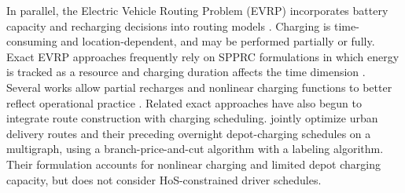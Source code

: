 \documentclass[3p,11pt,authoryear]{elsarticle}  %
\begin{document}

In parallel, the Electric Vehicle Routing Problem (EVRP) incorporates battery capacity and recharging decisions into routing models \citet{schneider2014electric}. Charging is time-consuming and location-dependent, and may be performed partially or fully. Exact EVRP approaches frequently rely on SPPRC formulations in which energy is tracked as a resource and charging duration affects the time dimension \citep{desaulniers2016exact, lam2022branch}. Several works allow partial recharges and nonlinear charging functions to better reflect operational practice \citep{montoya2017electric, froger2019improved}. Related exact approaches have also begun to integrate route construction with charging scheduling. \citet{yamin2025electric} jointly optimize urban delivery routes and their preceding overnight depot-charging schedules on a multigraph, using a branch-price-and-cut algorithm with a labeling algorithm. Their formulation accounts for nonlinear charging and limited depot charging capacity, but does not consider HoS-constrained driver schedules.
\end{document}
